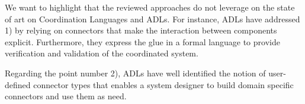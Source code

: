 We want to highlight that the reviewed approaches do not leverage on the state of art on Coordination Languages and ADLs. For instance, ADLs have addressed 1) by relying on connectors that make the interaction between components explicit. Furthermore, they express the glue in a formal language to provide verification and validation of the coordinated system. 
		
Regarding the point number 2), ADLs have well identified the notion of user-defined connector types that enables a system designer to build domain specific connectors and use them as need.
	
	 	
 		 		
 		
 		
 		
 		
	
